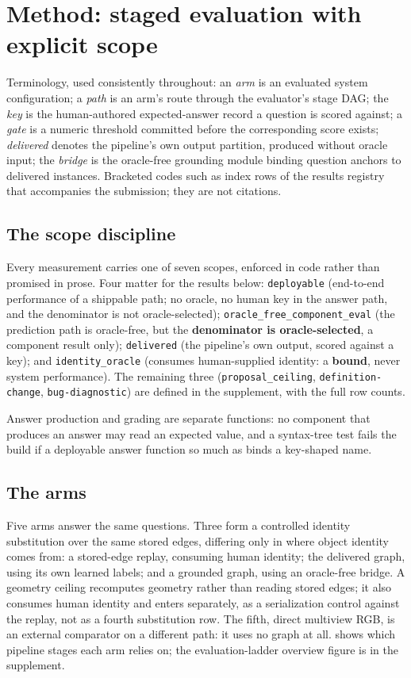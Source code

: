 \section{Method: staged evaluation with explicit scope}
\label{sec:method}

Terminology, used consistently throughout: an \emph{arm} is an evaluated system
configuration; a \emph{path} is an arm's route through the evaluator's stage DAG; the
\emph{key} is the human-authored expected-answer record a question is scored against; a
\emph{gate} is a numeric threshold committed before the corresponding score
exists; \emph{delivered} denotes the pipeline's own output partition, produced without
oracle input; the \emph{bridge} is the oracle-free grounding module binding question
anchors to delivered instances. Bracketed codes such as  index rows of the
results registry that accompanies the submission; they are not citations.

\subsection{The scope discipline}

Every measurement carries one of seven scopes, enforced in code rather than promised in
prose. Four matter for the results below: \texttt{deployable} (end-to-end performance of
a shippable path; no oracle, no human key in the answer path, and the denominator is not
oracle-selected); \texttt{oracle\_free\_component\_eval} (the prediction path is
oracle-free, but the \textbf{denominator is oracle-selected}, a component result
only); \texttt{delivered} (the pipeline's own output, scored against a key); and
\texttt{identity\_oracle} (consumes human-supplied identity: a \textbf{bound}, never
system performance). The remaining three (\texttt{proposal\_ceiling},
\texttt{definition-change}, \texttt{bug-diagnostic}) are defined in the supplement,
with the full row counts.

Answer production and grading are separate functions: no component that produces an
answer may read an expected value, and a syntax-tree test fails the build if a deployable
answer function so much as binds a key-shaped name.

\subsection{The arms}

Five arms answer the same questions. Three form a controlled identity substitution over
the same stored edges, differing only in where object identity comes from: a stored-edge
replay, consuming human identity; the delivered graph, using its own learned labels; and
a grounded graph, using an oracle-free bridge. A geometry ceiling recomputes geometry
rather than reading stored edges; it also consumes human identity and enters separately,
as a serialization control against the replay, not as a fourth substitution row. The
fifth, direct multiview RGB, is an external comparator on a different path: it uses no
graph at all.
 shows which pipeline stages each arm relies on; the evaluation-ladder
overview figure is in the supplement.

